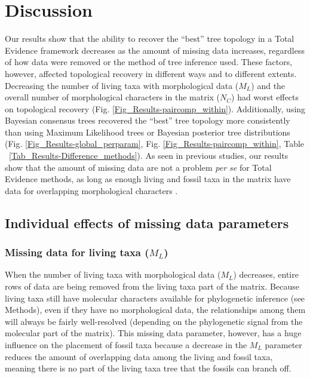 %
%


\section{Discussion}

Our results show that the ability to recover the ``best'' tree topology in a Total Evidence framework decreases as the amount of missing data increases, regardless of how data were removed or the method of tree inference used.
These factors, however, affected topological recovery in different ways and to different extents.
Decreasing the number of living taxa with morphological data ($M_{L}$) and the overall number of morphological characters in the matrix ($N_{C}$) had worst effects on topological recovery (Fig. \ref{Fig_Results-paircomp_within}).
Additionally, using Bayesian consensus trees recovered the ``best'' tree topology more consistently than using Maximum Likelihood trees or Bayesian posterior tree distributions (Fig. \ref{Fig_Results-global_perparam}, Fig. \ref{Fig_Results-paircomp_within}, Table ~\ref{Tab_Results-Difference_methods}).
As seen in previous studies, our results show that the amount of missing data are not a problem \textit{per se} for Total Evidence methods, as long as enough living and fossil taxa in the matrix have data for overlapping morphological characters \citep[e.g.][]{kearneyfragmentary2002,wiensmissing2003,rouresite-specific2011,pattinsonphylogeny2014}.

\subsection{Individual effects of missing data parameters}
\subsubsection*{Missing data for living taxa ($M_{L}$)}
When the number of living taxa with morphological data ($M_{L}$) decreases, entire rows of data are being removed from the living taxa part of the matrix.
Because living taxa still have molecular characters available for phylogenetic inference (see Methods), even if they have no morphological data, the relationships among them will always be fairly well-resolved (depending on the phylogenetic signal from the molecular part of the matrix).
This missing data parameter, however, has a huge influence on the placement of fossil taxa because a decrease in the $M_{L}$ parameter reduces the amount of overlapping data among the living and fossil taxa, meaning there is no part of the living taxa tree that the fossils can branch off.

